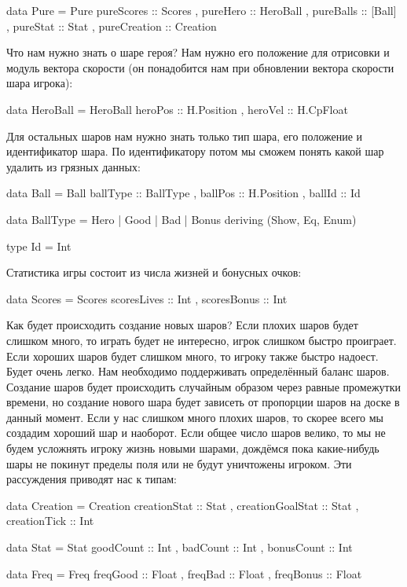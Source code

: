 \begin{code}
data Pure = Pure
    { pureScores     :: Scores
    , pureHero       :: HeroBall
    , pureBalls      :: [Ball]
    , pureStat       :: Stat
    , pureCreation   :: Creation
    }
\end{code}

Что нам нужно знать о шаре героя? Нам нужно его положение для отрисовки
и модуль вектора скорости (он понадобится нам при обновлении вектора
скорости шара игрока):


\begin{code}
data HeroBall = HeroBall
    { heroPos   :: H.Position
    , heroVel   :: H.CpFloat
    }
\end{code}

Для остальных шаров нам нужно знать только тип шара, его положение и
идентификатор шара. По идентификатору потом мы сможем понять какой шар
удалить из грязных данных:


\begin{code}
data Ball = Ball
    { ballType      :: BallType
    , ballPos       :: H.Position
    , ballId        :: Id
    }

data BallType = Hero | Good | Bad | Bonus
    deriving (Show, Eq, Enum)

type Id = Int
\end{code}

Статистика игры состоит из числа жизней и бонусных очков:


\begin{code}
data Scores = Scores 
    { scoresLives :: Int
    , scoresBonus :: Int
    } 
\end{code}

Как будет происходить создание новых шаров? Если плохих шаров будет
слишком много, то играть будет не интересно, игрок слишком быстро
проиграет. Если хороших шаров будет слишком много, то игроку также
быстро надоест. Будет очень легко. Нам необходимо поддерживать
определённый баланс шаров. Создание шаров будет происходить случайным
образом через равные промежутки времени, но создание нового шара будет
зависеть от пропорции шаров на доске в данный момент. Если у нас слишком
много плохих шаров, то скорее всего мы создадим хороший шар и наоборот.
Если общее число шаров велико, то мы не будем усложнять игроку жизнь
новыми шарами, дождёмся пока какие-нибудь шары не покинут пределы поля
или не будут уничтожены игроком. Эти рассуждения приводят нас к типам:


\begin{code}
data Creation = Creation 
    { creationStat      :: Stat
    , creationGoalStat  :: Stat
    , creationTick      :: Int
    }

data Stat = Stat
    { goodCount     :: Int
    , badCount      :: Int
    , bonusCount    :: Int
    } 

data Freq = Freq 
    { freqGood      :: Float
    , freqBad       :: Float
    , freqBonus     :: Float
    } 
\end{code}

